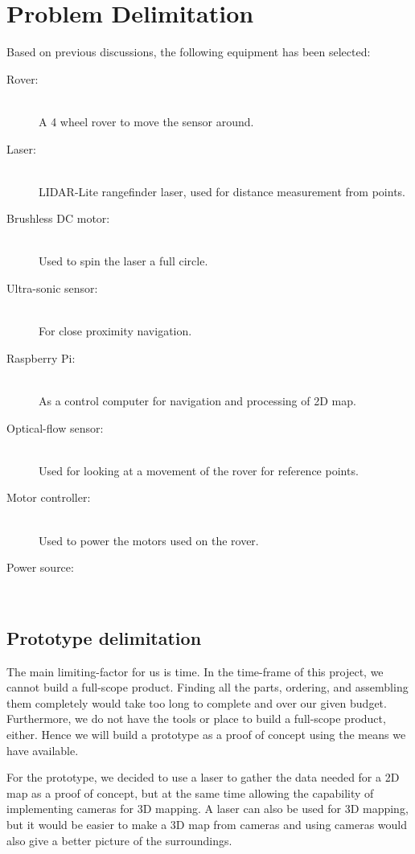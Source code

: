 \section{Problem Delimitation}
Based on previous discussions, the following equipment has been selected:

\begin{description}
  \item[Rover:] \hfill \\
  A 4 wheel rover to move the sensor around.
  \item[Laser:] \hfill \\
  LIDAR-Lite rangefinder laser, used for distance measurement from points.
  \item[Brushless DC motor:] \hfill \\
  Used to spin the laser a full circle.
  \item[Ultra-sonic sensor:] \hfill \\
  For close proximity navigation.
  \item[Raspberry Pi:] \hfill \\
  As a control computer for navigation and processing of 2D map.
  \item[Optical-flow sensor:] \hfill \\
  Used for looking at a movement of the rover for reference points.
  \item[Motor controller:] \hfill \\
  Used to power the motors used on the rover.
  \item[Power source:] \hfill \\
\end{description}

\subsection{Prototype delimitation}
The main limiting-factor for us is time. In the time-frame of this project, we cannot build a full-scope product. Finding all the parts, ordering, and assembling them completely would take too long to complete and over our given budget. Furthermore, we do not have the tools or place to build a full-scope product, either. Hence we will build a prototype as a proof of concept using the means we have available.

For the prototype, we decided to use a laser to gather the data needed for a 2D map as a proof of concept, but at the same time allowing the capability of implementing cameras for 3D mapping. A laser can also be used for 3D mapping, but it would be easier to make a 3D map from cameras and using cameras would also give a better picture of the surroundings.

